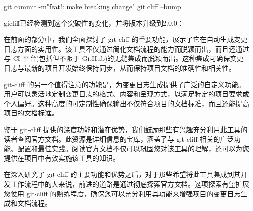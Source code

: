 \begin{shell}
git commit -m"feat!: make breaking change"
git cliff --bump
\end{shell}

gicliff已经检测到这个突破性的变化，并将版本升级到2.0.0：


在前面的部分中，我们全面探讨了 git-cliff 的重要功能，展示了它在自动生成变更日志方面的实用性。该工具不仅通过简化文档流程的能力而脱颖而出，而且还通过与 CI 平台(包括但不限于 GitHub)的无缝集成而脱颖而出。这种集成可确保变更日志与最新的项目开发始终保持同步，从而保持项目文档的准确性和相关性。

git-cliff 的另一个值得注意的功能是，为变更日志生成提供了广泛的自定义功能。用户可以灵活地定制变更日志的格式、内容和呈现方式，以满足特定的项目要求或个人偏好。这种高度的可定制性确保输出不仅符合项目的文档标准，而且还能提高项目的文档标准。

鉴于 git-cliff 提供的深度功能和潜在优势，我们鼓励那些有兴趣充分利用此工具的读者查阅官方文档。此资源是详细信息的宝库，涵盖了与 git-cliff 相关的广泛功能、配置和最佳实践。阅读官方文档不仅可以巩固您对该工具的理解，还可以为您提供在项目中有效实施该工具的知识。

在深入研究了 git-cliff 的主要功能和优势之后，对于那些希望将此工具集成到其开发工作流程中的人来说，前进的道路是通过彻底探索官方文档。这项探索有望扩展您使用 git-cliff 的熟练程度，确保您可以充分利用其功能来增强项目的变更日志生成和文档流程。













